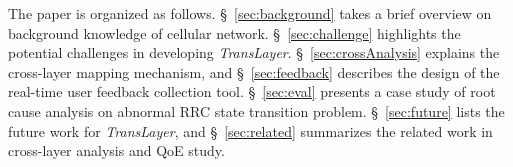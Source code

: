 The paper is organized as follows. \S~\ref{sec:background} takes a brief overview on background knowledge of cellular network. \S~\ref{sec:challenge} highlights the potential challenges in developing \textit{TransLayer}. \S~\ref{sec:crossAnalysis} explains the cross-layer mapping mechanism, and \S~\ref{sec:feedback} describes the design of the real-time user feedback collection tool. \S~\ref{sec:eval} presents a case study of root cause analysis on abnormal RRC state transition problem. \S~\ref{sec:future} lists the future work for \textit{TransLayer}, and \S~\ref{sec:related} summarizes the related work in cross-layer analysis and QoE study.